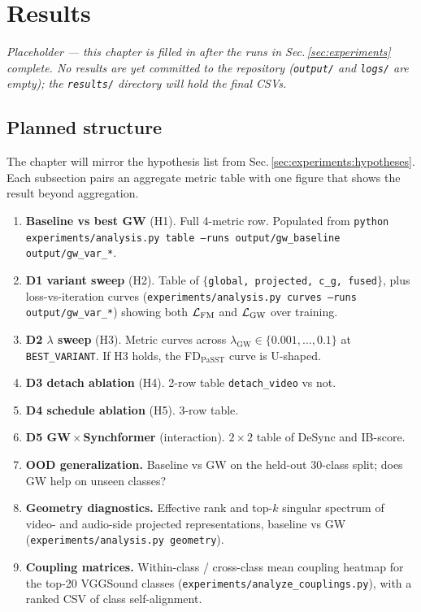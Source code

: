 \section{Results}
\label{sec:results}

\emph{Placeholder — this chapter is filled in after the runs in
Sec.\,\ref{sec:experiments} complete. No results are yet
committed to the repository (\texttt{output/} and \texttt{logs/}
are empty); the \texttt{results/} directory will hold the final
CSVs.}

\subsection*{Planned structure}
The chapter will mirror the hypothesis list from
Sec.\,\ref{sec:experiments:hypotheses}. Each subsection pairs an
aggregate metric table with one figure that shows the result
beyond aggregation.
\begin{enumerate}[leftmargin=*]
  \item \textbf{Baseline vs best GW} (H1). Full 4-metric row.
    Populated from \texttt{python experiments/analysis.py table
    --runs output/gw\_baseline output/gw\_var\_*}.
  \item \textbf{D1 variant sweep} (H2). Table of
    $\{$\texttt{global, projected, c\_g, fused}$\}$, plus
    loss-vs-iteration curves
    (\texttt{experiments/analysis.py curves --runs
    output/gw\_var\_*}) showing both $\mathcal{L}_{\mathrm{FM}}$ and $\mathcal{L}_{\mathrm{GW}}$ over
    training.
  \item \textbf{D2 $\lambda$ sweep} (H3). Metric curves across
    $\lambda_{\mathrm{GW}} \in \{0.001,\ldots,0.1\}$ at
    \texttt{BEST\_VARIANT}. If H3 holds, the FD$_{\text{PaSST}}$
    curve is U-shaped.
  \item \textbf{D3 detach ablation} (H4). 2-row table
    \texttt{detach\_video} vs not.
  \item \textbf{D4 schedule ablation} (H5). 3-row table.
  \item \textbf{D5 GW\,$\times$\,Synchformer} (interaction).
    $2 \times 2$ table of DeSync and IB-score.
  \item \textbf{OOD generalization.} Baseline vs GW on the
    held-out 30-class split; does GW help on unseen classes?
  \item \textbf{Geometry diagnostics.} Effective rank and top-$k$
    singular spectrum of video- and audio-side projected
    representations, baseline vs GW
    (\texttt{experiments/analysis.py geometry}).
  \item \textbf{Coupling matrices.} Within-class / cross-class
    mean coupling heatmap for the top-20 VGGSound classes
    (\texttt{experiments/analyze\_couplings.py}), with a ranked
    CSV of class self-alignment.
\end{enumerate}

